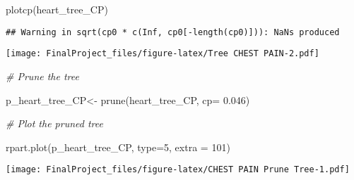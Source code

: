 \documentclass[
]{article}
\newenvironment{Shaded}{\begin{snugshade}}{\end{snugshade}}
\newcommand{\AttributeTok}[1]{\textcolor[rgb]{0.77,0.63,0.00}{#1}}
\newcommand{\CommentTok}[1]{\textcolor[rgb]{0.56,0.35,0.01}{\textit{#1}}}
\newcommand{\DecValTok}[1]{\textcolor[rgb]{0.00,0.00,0.81}{#1}}
\newcommand{\FloatTok}[1]{\textcolor[rgb]{0.00,0.00,0.81}{#1}}
\newcommand{\FunctionTok}[1]{\textcolor[rgb]{0.00,0.00,0.00}{#1}}
\newcommand{\NormalTok}[1]{#1}
\newcommand{\OtherTok}[1]{\textcolor[rgb]{0.56,0.35,0.01}{#1}}
\newcommand{\SpecialCharTok}[1]{\textcolor[rgb]{0.00,0.00,0.00}{#1}}
\newcommand{\StringTok}[1]{\textcolor[rgb]{0.31,0.60,0.02}{#1}}
\begin{document}
\begin{Shaded}
\begin{Highlighting}[]
\FunctionTok{plotcp}\NormalTok{(heart\_tree\_CP)}
\end{Highlighting}
\end{Shaded}

\begin{verbatim}
## Warning in sqrt(cp0 * c(Inf, cp0[-length(cp0)])): NaNs produced
\end{verbatim}

\texttt{[image: FinalProject\_files/figure-latex/Tree CHEST PAIN-2.pdf]}

\begin{Shaded}
\begin{Highlighting}[]
\CommentTok{\# Prune the tree}

\NormalTok{p\_heart\_tree\_CP}\OtherTok{\textless{}{-}} \FunctionTok{prune}\NormalTok{(heart\_tree\_CP, }\AttributeTok{cp=} \FloatTok{0.046}\NormalTok{)}


\CommentTok{\# Plot the pruned tree}

\FunctionTok{rpart.plot}\NormalTok{(p\_heart\_tree\_CP, }
           \AttributeTok{type=}\DecValTok{5}\NormalTok{, }
           \AttributeTok{extra =} \DecValTok{101}\NormalTok{)}
\end{Highlighting}
\end{Shaded}

\texttt{[image: FinalProject\_files/figure-latex/CHEST PAIN Prune Tree-1.pdf]}

\begin{Shaded}
\end{Shaded}
\end{document}
